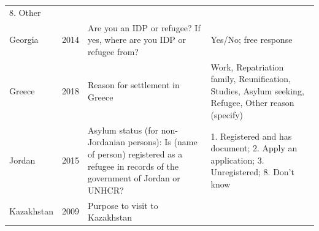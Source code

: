 \documentclass[
]{article}
\begin{document}
\begin{longtable}[]{@{}llll@{}}
\begin{minipage}[t]{0.22\columnwidth}
8. Other\strut
\end{minipage}\tabularnewline
\begin{minipage}[t]{0.22\columnwidth}\raggedright
Georgia\strut
\end{minipage} & \begin{minipage}[t]{0.22\columnwidth}\raggedright
2014\strut
\end{minipage} & \begin{minipage}[t]{0.22\columnwidth}\raggedright
Are you an IDP
or refugee? If
yes, where are
you IDP or
refugee from?\strut
\end{minipage} & \begin{minipage}[t]{0.22\columnwidth}\raggedright
Yes/No; free
response\strut
\end{minipage}\tabularnewline
\begin{minipage}[t]{0.22\columnwidth}\raggedright
Greece\strut
\end{minipage} & \begin{minipage}[t]{0.22\columnwidth}\raggedright
2018\strut
\end{minipage} & \begin{minipage}[t]{0.22\columnwidth}\raggedright
Reason for
settlement in
Greece\strut
\end{minipage} & \begin{minipage}[t]{0.22\columnwidth}\raggedright
Work,
Repatriation
family,
Reunification,
Studies, Asylum
seeking,
Refugee, Other
reason
(specify)\strut
\end{minipage}\tabularnewline
\begin{minipage}[t]{0.22\columnwidth}\raggedright
Jordan\strut
\end{minipage} & \begin{minipage}[t]{0.22\columnwidth}\raggedright
2015\strut
\end{minipage} & \begin{minipage}[t]{0.22\columnwidth}\raggedright
Asylum status
(for
non-Jordanian
persons): Is
(name of
person)
registered as a
refugee in
records of the
government of
Jordan or
UNHCR?\strut
\end{minipage} & \begin{minipage}[t]{0.22\columnwidth}\raggedright
1. Registered
and has
document; 2.
Apply an
application;
3.
Unregistered;
8. Don't know\strut
\end{minipage}\tabularnewline
\begin{minipage}[t]{0.22\columnwidth}\raggedright
Kazakhstan\strut
\end{minipage} & \begin{minipage}[t]{0.22\columnwidth}\raggedright
2009\strut
\end{minipage} & \begin{minipage}[t]{0.22\columnwidth}\raggedright
Purpose to
visit to
Kazakhstan


\end{minipage}
\end{longtable}
\end{document}

